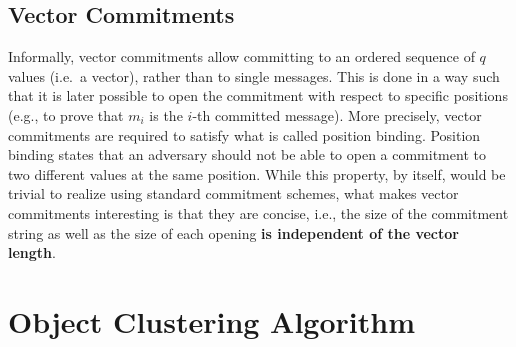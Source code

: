 \subsection{Vector Commitments}\label{subsec:impl-zk-edbs}

Informally, vector commitments allow committing to an ordered sequence of $q$ values
(i.e.\ a vector), rather than to single messages. This is done in a way such that it is later possible
to open the commitment with respect to specific positions (e.g., to prove that $m_i$ is the $i$-th committed
message). More precisely, vector commitments are required to satisfy what is called position binding.
Position binding states that an adversary should not be able to open a commitment to two different
values at the same position. While this property, by itself, would be trivial to realize using standard
commitment schemes, what makes vector commitments interesting is that they are concise, i.e.,
the size of the commitment string as well as the size of each opening \textbf{is independent of the
vector length}.


\section{Object Clustering Algorithm}\label{sec:clustering}



